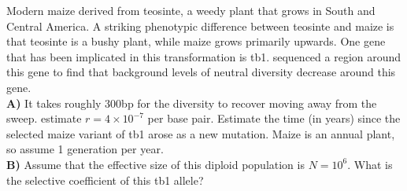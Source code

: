 \begin{question}{}
  Modern maize derived from teosinte, a weedy plant that grows in South and
  Central America. A striking phenotypic difference between teosinte and maize
  is that teosinte is a bushy plant, while maize grows primarily upwards. One
  gene that has been implicated in this transformation is tb1. \citet{wang1999limits} sequenced a region around this
  gene to find that background levels of neutral diversity decrease around this
  gene.\\

{\bf A)} It takes roughly 300bp for the diversity to recover moving
away from the sweep.  \citeauthor{wang1999limits} estimate
$r = 4 \times 10^{-7}$ per base pair. Estimate the time (in years) since the selected maize
variant of tb1 arose as a new mutation. Maize is an annual plant, so assume 1
generation per year.\\
{\bf B)} Assume that the effective size of this diploid population is $N = 10^6$. What is the selective
coefficient of this tb1 allele?
\end{question}

